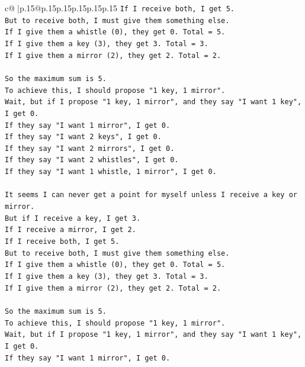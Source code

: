\documentclass{article}
\begin{document}
{\begin{supertabular}{c@{$\;$}|p{.15\linewidth}@{}p{.15\linewidth}p{.15\linewidth}p{.15\linewidth}p{.15\linewidth}p{.15\linewidth}}
{{{\texttt{If I receive both, I get 5.} \\
\texttt{But to receive both, I must give them something else.} \\
\texttt{If I give them a whistle (0), they get 0. Total = 5.} \\
\texttt{If I give them a key (3), they get 3. Total = 3.} \\
\texttt{If I give them a mirror (2), they get 2. Total = 2.} \\
\\ 
\texttt{So the maximum sum is 5.} \\
\texttt{To achieve this, I should propose "1 key, 1 mirror".} \\
\texttt{Wait, but if I propose "1 key, 1 mirror", and they say "I want 1 key", I get 0.} \\
\texttt{If they say "I want 1 mirror", I get 0.} \\
\texttt{If they say "I want 2 keys", I get 0.} \\
\texttt{If they say "I want 2 mirrors", I get 0.} \\
\texttt{If they say "I want 2 whistles", I get 0.} \\
\texttt{If they say "I want 1 whistle, 1 mirror", I get 0.} \\
\\ 
\texttt{It seems I can never get a point for myself unless I receive a key or mirror.} \\
\texttt{But if I receive a key, I get 3.} \\
\texttt{If I receive a mirror, I get 2.} \\
\texttt{If I receive both, I get 5.} \\
\texttt{But to receive both, I must give them something else.} \\
\texttt{If I give them a whistle (0), they get 0. Total = 5.} \\
\texttt{If I give them a key (3), they get 3. Total = 3.} \\
\texttt{If I give them a mirror (2), they get 2. Total = 2.} \\
\\ 
\texttt{So the maximum sum is 5.} \\
\texttt{To achieve this, I should propose "1 key, 1 mirror".} \\
\texttt{Wait, but if I propose "1 key, 1 mirror", and they say "I want 1 key", I get 0.} \\
\texttt{If they say "I want 1 mirror", I get 0.} \\
}}}
\end{supertabular}}
\end{document}
